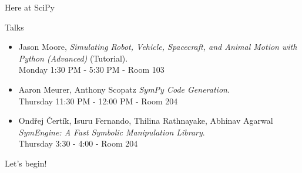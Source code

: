 \documentclass[xcolor=svgnames]{beamer}
\begin{document}
\begin{frame}{Here at SciPy}
  \begin{block}{Talks}
    \begin{itemize}
    \item \normalsize Jason Moore, \textit{Simulating Robot, Vehicle, Spacecraft, and Animal Motion with Python (Advanced)}
      (Tutorial). \\ \footnotesize Monday 1:30 PM - 5:30 PM - Room 103
    \item \normalsize Aaron Meurer, Anthony Scopatz \textit{SymPy Code Generation}. \\ \footnotesize Thursday 11:30
      PM - 12:00 PM - Room 204
    \item \normalsize Ondřej Čertík, Isuru Fernando, Thilina Rathnayake, Abhinav Agarwal \textit{SymEngine: A Fast Symbolic Manipulation Library}. \\ \footnotesize Thursday 3:30
      - 4:00 - Room 204
    \end{itemize}
  \end{block}
\end{frame}


\begin{frame}
\Huge Let's begin!
\end{frame}
\end{document}
